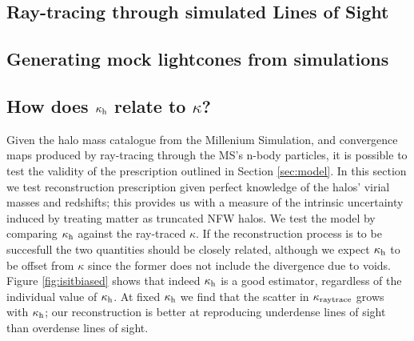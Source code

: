 \documentclass[useAMS,usenatbib]{mn2e}
\begin{document}
\subsection{Ray-tracing through simulated Lines of Sight}
\label{subsec:raytracing}

\subsection{Generating mock lightcones from simulations}

\subsection{How does $\kappa_{\rm h}$ relate to $\kappa$?}

Given the halo mass catalogue from the Millenium Simulation, 
and convergence maps produced by ray-tracing through the MS's n-body particles, 
it is possible to test the validity of the prescription outlined
in Section \ref{sec:model}. In this section we test reconstruction prescription given perfect
knowledge of the halos' virial masses and redshifts; this provides us with a measure of the intrinsic uncertainty induced by treating matter as truncated NFW halos. 
We test the model by comparing $\kappa_{\rm h}$ against
the ray-traced $\kappa$. If the reconstruction process is to be
succesfull the two quantities should be closely related, although
we expect $\kappa_{\rm h}$ to be offset from $\kappa$ since the former 
does not include the divergence due to voids. Figure \ref{fig:isitbiased} shows that indeed $\kappa_{\rm h}$ is a good estimator, regardless of the individual value of $\kappa_{\rm h}$. At fixed $\kappa_{\rm h}$ we find that the scatter in $\kappa_{\rm raytrace}$ grows with $\kappa_{\rm h}$; our reconstruction is better at reproducing underdense lines of sight than overdense lines of sight.
\end{document}
